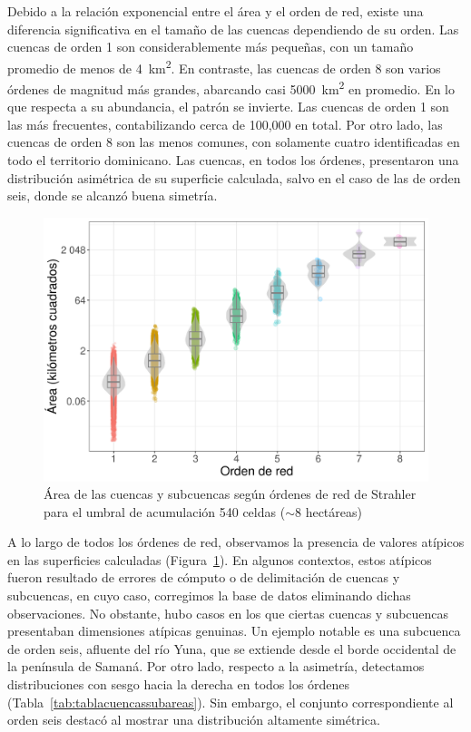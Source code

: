 \documentclass[spanish]{article}
\begin{document}
Debido a la relación exponencial entre el área y el orden de red, existe
una diferencia significativa en el tamaño de las cuencas dependiendo de
su orden. Las cuencas de orden 1 son considerablemente más pequeñas, con
un tamaño promedio de menos de 4~km\textsuperscript{2}. En contraste,
las cuencas de orden 8 son varios órdenes de magnitud más grandes,
abarcando casi 5000~km\textsuperscript{2} en promedio. En lo que
respecta a su abundancia, el patrón se invierte. Las cuencas de orden 1
son las más frecuentes, contabilizando cerca de 100,000 en total. Por
otro lado, las cuencas de orden 8 son las menos comunes, con solamente
cuatro identificadas en todo el territorio dominicano. Las cuencas, en
todos los órdenes, presentaron una distribución asimétrica de su
superficie calculada, salvo en el caso de las de orden seis, donde se
alcanzó buena simetría.

\begin{figure}

{\centering \includegraphics[width=0.8\linewidth]{figuras/cuencas-subcuencas-areas-ordenes-boxplot} 

}

\caption{Área de las cuencas y subcuencas según órdenes de red de Strahler para el umbral de acumulación 540 celdas ($\sim$8 hectáreas)}\label{fig:ordenarecuencas}
\end{figure}

A lo largo de todos los órdenes de red, observamos la presencia de
valores atípicos en las superficies calculadas
(Figura~\ref{fig:ordenarecuencas}). En algunos contextos, estos atípicos
fueron resultado de errores de cómputo o de delimitación de cuencas y
subcuencas, en cuyo caso, corregimos la base de datos eliminando dichas
observaciones. No obstante, hubo casos en los que ciertas cuencas y
subcuencas presentaban dimensiones atípicas genuinas. Un ejemplo notable
es una subcuenca de orden seis, afluente del río Yuna, que se extiende
desde el borde occidental de la península de Samaná. Por otro lado,
respecto a la asimetría, detectamos distribuciones con sesgo hacia la
derecha en todos los órdenes (Tabla~\ref{tab:tablacuencassubareas}). Sin
embargo, el conjunto correspondiente al orden seis destacó al mostrar
una distribución altamente simétrica.
\end{document}
